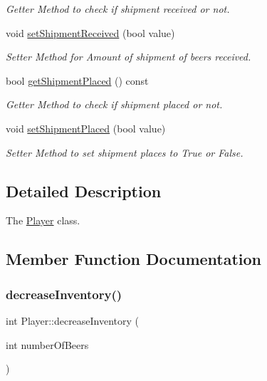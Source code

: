 \begin{DoxyCompactItemize}
\begin{DoxyCompactList}\small\item\em Getter Method to check if shipment received or not. \end{DoxyCompactList}\item 
void \hyperlink{classPlayer_a6b24d6f3b7d11df39c621a2dfb4d19e4}{set\+Shipment\+Received} (bool value)
\begin{DoxyCompactList}\small\item\em Setter Method for Amount of shipment of beers received. \end{DoxyCompactList}\item 
bool \hyperlink{classPlayer_a90c450a83447d63a40c22eca44624121}{get\+Shipment\+Placed} () const
\begin{DoxyCompactList}\small\item\em Getter Method to check if shipment placed or not. \end{DoxyCompactList}\item 
void \hyperlink{classPlayer_ae6ff3d0d308302f5fc64071991e3cdda}{set\+Shipment\+Placed} (bool value)
\begin{DoxyCompactList}\small\item\em Setter Method to set shipment places to True or False. \end{DoxyCompactList}\end{DoxyCompactItemize}


\subsection{Detailed Description}
The \hyperlink{classPlayer}{Player} class. 

\subsection{Member Function Documentation}
\mbox{\label{classPlayer_ae2197d1061a24fa444129b5ea85996d5}} 
\subsubsection{\texorpdfstring{decrease\+Inventory()}{decreaseInventory()}}
{\footnotesize\ttfamily int Player\+::decrease\+Inventory (\begin{DoxyParamCaption}\item[{int}]{number\+Of\+Beers }\end{DoxyParamCaption})}



